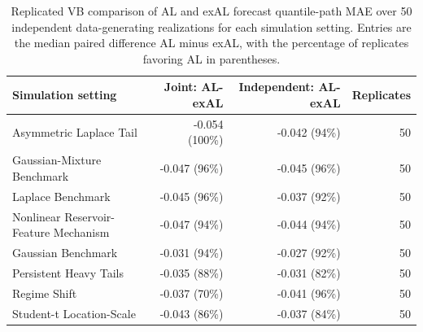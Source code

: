 \begin{table}[!htbp]
\centering
\scriptsize
\begin{tabular}{@{}>{\raggedright\arraybackslash}p{}rrr@{}}
\toprule
Simulation setting & Joint: AL-exAL & Independent: AL-exAL & Replicates
\\
\midrule
Asymmetric Laplace Tail & -0.054 (100\%) & -0.042 (94\%) & 50 \\
Gaussian-Mixture Benchmark & -0.047 (96\%) & -0.045 (96\%) & 50 \\
Laplace Benchmark & -0.045 (96\%) & -0.037 (92\%) & 50 \\
Nonlinear Reservoir-Feature Mechanism & -0.047 (94\%) & -0.044 (94\%) & 50 \\
Gaussian Benchmark & -0.031 (94\%) & -0.027 (92\%) & 50 \\
Persistent Heavy Tails & -0.035 (88\%) & -0.031 (82\%) & 50 \\
Regime Shift & -0.037 (70\%) & -0.041 (96\%) & 50 \\
Student-t Location-Scale & -0.043 (86\%) & -0.037 (84\%) & 50 \\
\bottomrule
\end{tabular}
\caption{Replicated VB comparison of AL and exAL forecast quantile-path MAE over 50 independent data-generating realizations for each simulation setting. Entries are the median paired difference AL minus exAL, with the percentage of replicates favoring AL in parentheses.}
\label{qdesn:tab:joint-qdesn-article-validation-phase153-replication-summary}
\end{table}
